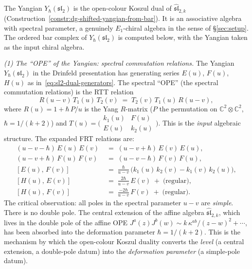 \begin{computation}%
\label{comp:yangian-e1-shadow}%
%
%
%
%
The Yangian $Y_\hbar(\mathfrak{sl}_2)$ is the open-colour
Koszul dual of $\widehat{\mathfrak{sl}}_{2,k}$
(Construction~\ref{constr:dg-shifted-yangian-from-bar}).
It is an associative algebra with spectral parameter, a genuinely
$E_1$-chiral algebra in the sense of \S\ref{sec:setup}. The
ordered bar complex of $Y_\hbar(\mathfrak{sl}_2)$ is computed
below, with the Yangian taken as the input chiral algebra.

\medskip
\noindent\emph{(1) The ``OPE'' of the Yangian: spectral
commutation relations.}
The Yangian $Y_\hbar(\mathfrak{sl}_2)$ in the Drinfeld
presentation has generating series
$E(u)$, $F(u)$, $H(u)$ as
in~\eqref{eq:sl2-dual-generators}. The spectral
``OPE'' (the spectral commutation relations) is
the RTT relation
\begin{equation}\label{eq:yangian-rtt-input}
R(u{-}v)\,T_1(u)\,T_2(v)
\;=\;
T_2(v)\,T_1(u)\,R(u{-}v),
\end{equation}
where $R(u) = 1 + \hbar\,P/u$ is the Yang $R$-matrix
($P$ the permutation on $\mathbb{C}^2\otimes\mathbb{C}^2$,
$\hbar = 1/(k{+}2)$) and
$T(u) = \bigl(\begin{smallmatrix}
k_1(u) & F(u) \\ E(u) & k_2(u)
\end{smallmatrix}\bigr)$.
This is the \emph{input} algebraic structure. The
expanded FRT relations are:
\begin{align}
(u{-}v{-}\hbar)\,E(u)\,E(v)
&\;=\;
(u{-}v{+}\hbar)\,E(v)\,E(u),
\label{eq:yangian-EE}\\[3pt]
(u{-}v{+}\hbar)\,F(u)\,F(v)
&\;=\;
(u{-}v{-}\hbar)\,F(v)\,F(u),
\label{eq:yangian-FF}\\[3pt]
[E(u),\,F(v)]
&\;=\;
\frac{\hbar}{u{-}v}\,
\bigl(k_1(u)\,k_2(v) - k_1(v)\,k_2(u)\bigr),
\label{eq:yangian-EF}\\[3pt]
[H(u),\,E(v)]
&\;=\;
\frac{2\hbar}{u{-}v}\,E(v)
\;+\;\text{(regular)},
\label{eq:yangian-HE}\\[3pt]
[H(u),\,F(v)]
&\;=\;
\frac{-2\hbar}{u{-}v}\,F(v)
\;+\;\text{(regular)}.
\label{eq:yangian-HF}
\end{align}
The critical observation: all poles in the spectral
parameter $u{-}v$ are \emph{simple}. There is no
double pole. The central extension of the affine algebra
$\widehat{\mathfrak{sl}}_{2,k}$, which lives in the
double pole of the affine OPE
$J^a(z)J^b(w) \sim k\,\kappa^{ab}/(z{-}w)^2 + \cdots$,
has been absorbed into the deformation parameter
$\hbar = 1/(k{+}2)$. This is the mechanism by which
the open-colour Koszul duality converts the
\emph{level} (a central extension, a double-pole datum)
into the \emph{deformation parameter} (a simple-pole
datum).


\end{computation}
